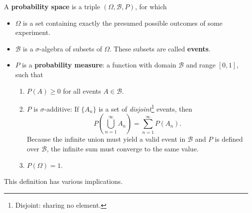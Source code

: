 \documentclass[12pt]{article}
\begin{document}
A \textbf{probability space} is a triple $(\Omega, \mathcal B, P)$, for which
\begin{itemize}
\item $\Omega$ is a set containing exactly the presumed possible outcomes of some experiment.
\item $\mathcal B$ is a $\sigma$-algebra of subsets of $\Omega$. These subsets are called \textbf{events}.
\item $P$ is a \textbf{probability measure}: a function with domain $\mathcal B$ and range $[0, 1]$, such that
\begin{enumerate}
\item $P(A) \geq 0$ for all events $A \in \mathcal B$.
\item $P$ is $\sigma$-additive: If $\{ A_n \}$ is a set of \emph{disjoint}\footnote{Disjoint: sharing no element.} events, then
\[ P\left( \bigcup_{n = 1}^\infty A_n \right) = \sum_{n = 1}^\infty P(A_n). \]
Because the infinite union must yield a valid event in $\mathcal B$ and $P$ is defined over $\mathcal B$, the infinite sum must converge to the same value.
\item $P(\Omega) = 1$.
\end{enumerate}
\end{itemize}
This definition has various implications.
\end{document}
